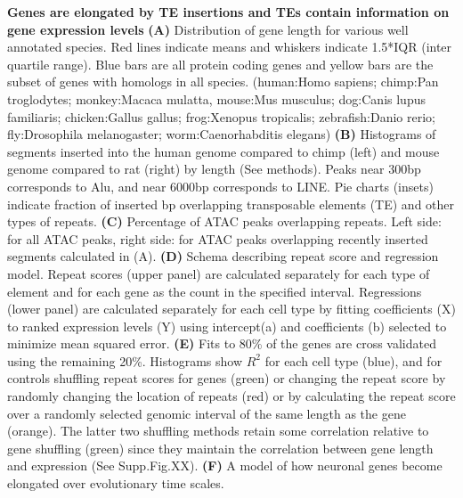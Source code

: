 \textbf{Genes are elongated by TE insertions and TEs contain information on gene expression levels}
\textbf{(A)} Distribution of gene length for various well annotated species. Red lines indicate means and whiskers indicate 1.5*IQR (inter quartile range). Blue bars are all protein coding genes and yellow bars are the subset of genes with homologs in all species. (human:Homo sapiens; chimp:Pan troglodytes; monkey:Macaca mulatta, mouse:Mus musculus; dog:Canis lupus familiaris; chicken:Gallus gallus; frog:Xenopus tropicalis; zebrafish:Danio rerio; fly:Drosophila melanogaster; worm:Caenorhabditis  elegans)
\textbf{(B)} Histograms of segments inserted into the human genome compared to chimp (left) and mouse genome compared to rat (right) by length (See methods). Peaks near 300bp corresponds to Alu, and near 6000bp corresponds to LINE. Pie charts (insets) indicate fraction of inserted bp overlapping transposable elements (TE) and other types of repeats.
\textbf{(C)} Percentage of ATAC peaks overlapping repeats. Left side: for all ATAC peaks, right side: for ATAC peaks overlapping recently inserted segments calculated in (A). 
\textbf{(D)} Schema describing repeat score and regression model. Repeat scores (upper panel) are calculated separately for each type of element and for each gene as the count in the specified interval. Regressions (lower panel) are calculated separately for each cell type by fitting coefficients (X) to ranked expression levels (Y) using intercept(a) and coefficients (b) selected to minimize mean squared error. 
\textbf{(E)} Fits to 80\% of the genes are cross validated using the remaining 20\%. Histograms show $R^2$ for each cell type (blue), and for controls shuffling repeat scores for genes (green) or changing the repeat score by randomly changing the location of repeats (red) or by calculating the repeat score over a randomly selected genomic interval of the same length as the gene (orange). The latter two shuffling methods  retain some correlation relative to gene shuffling (green) since they maintain the correlation between gene length and expression (See Supp.Fig.XX).
\textbf{(F)} A model of how neuronal genes become elongated over evolutionary time scales. 

